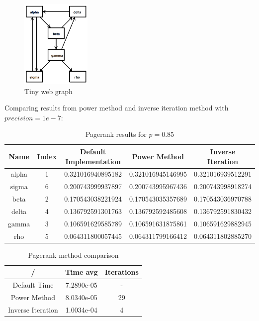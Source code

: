 \documentclass[unicode,11pt,a4paper,oneside,numbers=endperiod,openany]{scrartcl}
\begin{document}
\begin{figure}[H]
    \centering
    \includegraphics[width=0.3\textwidth]{figures/ex4_graph}
    \caption{Tiny web graph}
    \label{fig:ex4-graph}
\end{figure}

Comparing results from power method and inverse iteration method with $precision = 1e-7$:

\begin{table}[H]
    \centering
    \begin{tabular}{||c c c c c||}
        \hline
        Name  & Index & Default Implementation & Power Method      & Inverse Iteration \\ [0.5ex]
        \hline\hline
        alpha & 1     & 0.321016940895182      & 0.321016945146995 & 0.321016939512291 \\
        sigma & 6     & 0.200743999937897      & 0.200743995967436 & 0.200743998918274 \\
        beta  & 2     & 0.170543038221924      & 0.170543035357689 & 0.170543036970788 \\
        delta & 4     & 0.136792591301763      & 0.136792592485608 & 0.136792591830432 \\
        gamma & 3     & 0.106591629585789      & 0.106591631875861 & 0.106591629882945 \\
        rho   & 5     & 0.064311800057445      & 0.064311799166412 & 0.064311802885270 \\ [1ex]
        \hline
    \end{tabular}
    \caption{Pagerank results for $p = 0.85$}
    \label{table:ex4p2_pagerank_table}
\end{table}

\begin{table}[H]
    \centering
    \begin{tabular}{||c c c||}
        \hline
        /                 & Time avg   & Iterations \\ [0.5ex]
        \hline\hline
        Default Time      & 7.2890e-05 & -          \\
        Power Method      & 8.0340e-05 & 29         \\
        Inverse Iteration & 1.0034e-04 & 4          \\ [1ex]
        \hline
    \end{tabular}
    \caption{Pagerank method comparison}
    \label{tab:ex4p2_comparison}
\end{table}
\end{document}
